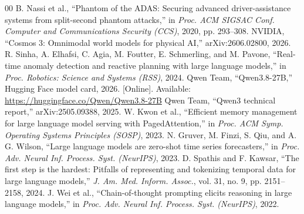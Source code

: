 \documentclass[conference]{IEEEtran}
\begin{document}
\begin{thebibliography}{00}
 B. Nassi et al., ``Phantom of the ADAS: Securing advanced driver-assistance systems from split-second phantom attacks,'' in \emph{Proc. ACM SIGSAC Conf. Computer and Communications Security (CCS)}, 2020, pp. 293--308.
 NVIDIA, ``Cosmos 3: Omnimodal world models for physical AI,'' arXiv:2606.02800, 2026.
 R. Sinha, A. Elhafsi, C. Agia, M. Foutter, E. Schmerling, and M. Pavone, ``Real-time anomaly detection and reactive planning with large language models,'' in \emph{Proc. Robotics: Science and Systems (RSS)}, 2024.
 Qwen Team, ``Qwen3.8-27B,'' Hugging Face model card, 2026. [Online]. Available: \url{https://huggingface.co/Qwen/Qwen3.8-27B}
 Qwen Team, ``Qwen3 technical report,'' arXiv:2505.09388, 2025.
 W. Kwon et al., ``Efficient memory management for large language model serving with PagedAttention,'' in \emph{Proc. ACM Symp. Operating Systems Principles (SOSP)}, 2023.
 N. Gruver, M. Finzi, S. Qiu, and A. G. Wilson, ``Large language models are zero-shot time series forecasters,'' in \emph{Proc. Adv. Neural Inf. Process. Syst. (NeurIPS)}, 2023.
 D. Spathis and F. Kawsar, ``The first step is the hardest: Pitfalls of representing and tokenizing temporal data for large language models,'' \emph{J. Am. Med. Inform. Assoc.}, vol. 31, no. 9, pp. 2151--2158, 2024.
 J. Wei et al., ``Chain-of-thought prompting elicits reasoning in large language models,'' in \emph{Proc. Adv. Neural Inf. Process. Syst. (NeurIPS)}, 2022.
\end{thebibliography}
\end{document}
